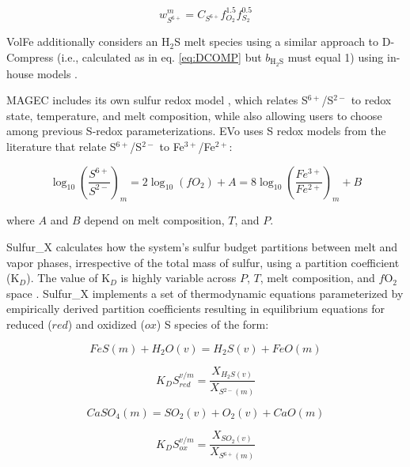 \documentclass[draft, english]{volcanica-template}
\begin{document}
\begin{equation}
    w^m_{S^{6+}} = C_{S^{6+}}f_{O_2}^{1.5}f_{S_2}^{0.5}
\end{equation}

\noindent VolFe additionally considers an H$_2$S melt species using a similar approach to D-Compress (i.e., calculated as in eq. \ref{eq:DCOMP} but $b_{\mathrm{H_2S}}$ must equal 1) using in-house models \parencite{hughes2024}. 

MAGEC includes its own sulfur redox model \parencite{Sun2024}, which relates S$^{6+}$/S$^{2-}$ to redox state, temperature, and melt composition, while also allowing users to choose among previous S-redox parameterizations. EVo uses S redox models from the literature \parencite[e.g.,][]{Nash2019,jugo2010,Oneill2022,boulliung2023sulfur} that relate S$^{6+}$/S$^{2-}$ to Fe$^{3+}$/Fe$^{2+}$: 

\begin{equation}
    \log_{10}\left( \frac{S^{6+}}{S^{2-}} \right)_m = 2\log_{10}(fO_2) + A = 8\log_{10}\left( \frac{Fe^{3+}}{Fe^{2+}} \right)_m + B
    \label{eq:FeSredox}
\end{equation}

\noindent where $A$ and $B$ depend on melt composition, $T$, and $P$. 

Sulfur\_X calculates how the system's sulfur budget partitions between melt and vapor phases, irrespective of the total mass of sulfur, using a partition coefficient (K$_D$). The value of K$_D$ is highly variable across $P$, $T$, melt composition, and $f$O$_2$ space \parencite[e.g.,][]{webster2011distribution}. Sulfur\_X implements a set of thermodynamic equations parameterized by empirically derived partition coefficients resulting in equilibrium equations for reduced ($red$) and oxidized ($ox$) S species of the form: 

\begin{equation}
    FeS(m) + H_2O(v) = H_2S(v) + FeO(m)
    \label{eq:SulfurX_red}
\end{equation}

\begin{equation}
    K_DS^{v/m}_{red} = \frac{X_{H{_2}S(v)}}{X_{S{^{2-}(m)}}}
    \label{eq:SulfurX_redKd}
\end{equation}

\begin{equation}
    CaSO_4(m) = SO_2(v) + O_2(v) + CaO(m)
    \label{eq:SulfurX_ox}
\end{equation}

\begin{equation}
    K_DS^{v/m}_{ox} = \frac{X_{SO{_2}(v)}}{X_{S{^{6+}(m)}}}
    \label{eq:SulfurX_oxKd}
\end{equation}
\end{document}
